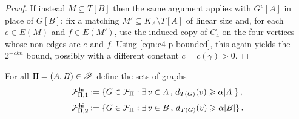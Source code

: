 \begin{proof}
If instead $M\subseteq T[B]$ then the same argument applies with $G^c[A]$ in place of $G[B]$: fix a matching $M'\subseteq K_A\setminus T[A]$ of linear size and, for each $e\in E(M)$ and $f\in E(M')$, use the induced copy of $C_4$ on the four vertices whose non-edges are $e$ and $f$. Using \eqref{eqn:c4-p-bounded}, this again yields the $2^{-ckn}$ bound, possibly with a different constant $c=c(\gamma)>0$.
\end{proof}

For all $\Pi=(A,B)\in{\mathscr P}$ define the sets of graphs
\[\arraycolsep=0.4mm
\begin{array}{ll}
\cF^\high_{\Pi,1} &:= \{G\in\cF_\Pi:\exists\,v\in A\,,\,d_{T(G)}(v)\geq\alpha|A|\}\,, \\[7pt]
\cF^\high_{\Pi,2} &:= \{G\in\cF_\Pi:\exists\,v\in B\,,\,d_{T(G)}(v)\geq\alpha|B|\}\,.
\end{array}\]


